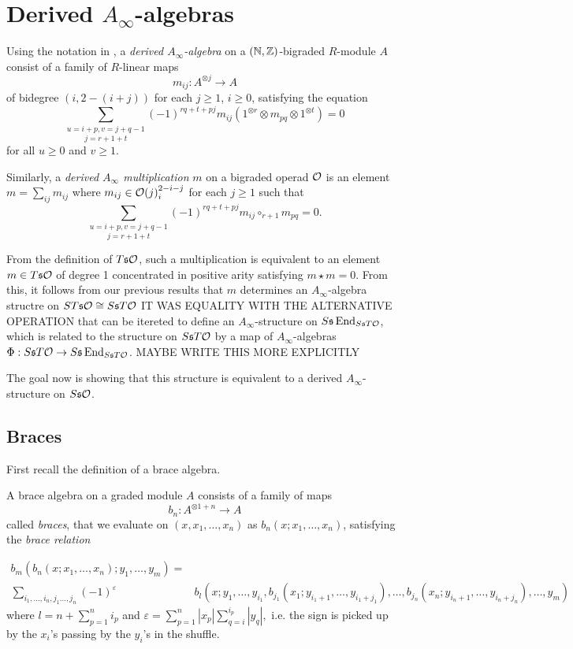 \documentclass[twoside]{article}
\begin{document}
\section{Derived $A_\infty$-algebras}
  \begin{definition}
  Using the notation in \cite{RW}, a \emph{derived $A_\infty$-algebra} on a $(\mathbb{N},\mathbb{Z})$-bigraded $R$-module $A$ consist of a family of $R$-linear maps 
\[m_{ij}:A^{\otimes j}\to A\]
of bidegree $(i,2-(i+j))$ for each $j\geq 1$, $i\geq 0$, satisfying the equation
\[\underset{j=r+1+t}{\sum_{u=i+p, v=j+q-1}}(-1)^{rq+t+pj}m_{ij}(1^{\otimes r}\otimes m_{pq}\otimes 1^{\otimes t})=0\]
for all $u\geq 0$ and $v\geq 1$. 


Similarly, a \emph{derived $A_\infty$ multiplication} $m$ on a bigraded operad ${\mathcal O}$ is an element $m=\sum_{ij}m_{ij}$ where $m_{ij}\in{\mathcal O}(j)^{2-i-j}_i$ for each $j\geq 1$ such that 
\[\underset{j=r+1+t}{\sum_{u=i+p, v=j+q-1}}(-1)^{rq+t+pj}m_{ij}\circ_{r+1} m_{pq}=0.\]
\end{definition}
From the definition of $T\mathfrak{s}{\mathcal O}$, such a multiplication is equivalent to an element $m\in T\mathfrak{s}{\mathcal O}$ of degree 1 concentrated in positive arity satisfying $m\star m=0$. From this, it follows from our previous results that $m$ determines an $A_\infty$-algebra structre on $ST\mathfrak{s}{\mathcal O}\cong S\mathfrak{s} T{\mathcal O}$ IT WAS EQUALITY WITH THE ALTERNATIVE OPERATION that can be itereted to define an $A_\infty$-structure on $S\mathfrak{s}\operatorname{End}_{S\mathfrak{s} T{\mathcal O}}$, which is related to the structure on $S\mathfrak{s} T{\mathcal O}$ by a map of $A_\infty$-algebras  $\Phi:S\mathfrak{s} T{\mathcal O}
\to  S\mathfrak{s}\operatorname{End}_{S\mathfrak{s} T{\mathcal O}}$.  MAYBE WRITE THIS MORE EXPLICITLY 

The goal now is showing that this structure is equivalent to a derived $A_\infty$-structure on $S\mathfrak{s} {\mathcal O}$. 


\subsection{Braces}\label{sectionbraces}
First recall the definition of a brace algebra.

\begin{defi}\label{braces}
A brace algebra on a graded module $A$ consists of a family of maps \[b_n:A^{\otimes 1+n}\to A\] called \emph{braces}, that we evaluate on $(x,x_1,\dots, x_n)$ as $b_n(x;x_1,\dots, x_n)$, satisfying the \emph{brace relation}


\begin{align*}
b_m(b_n(x;x_1,\dots, x_n);y_1,\dots,y_m)=&\\
\sum_{i_1,\dots, i_n, j_1\dots, j_n}(-1)^{\varepsilon}&b_l(x; y_1,\dots, y_{i_1},b_{j_1}(x_1;y_{i_1+1},\dots, y_{i_1+j_1}),\dots, b_{j_n}(x_n;y_{i_n+1},\dots, y_{i_n+j_n}),\dots,y_m)
\end{align*}
where $l=n+\sum_{p=1}^n i_p$ and $\varepsilon=\sum_{p=1}^n|x_p|\sum_{q=i}^{i_p}|y_q|,$ i.e. the sign is picked up by the $x_i$'s passing by the $y_i$'s in the shuffle.



\end{defi}
\end{document}
